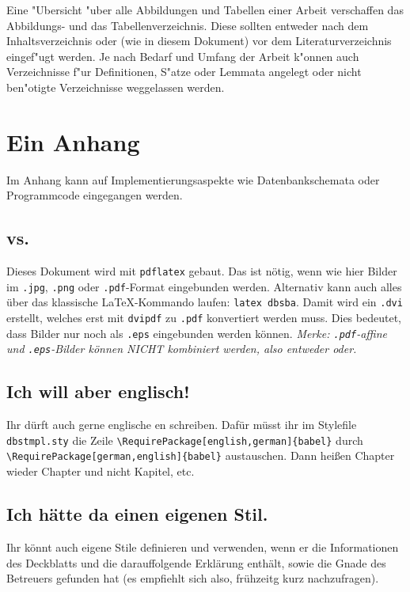 Eine "Ubersicht "uber alle Abbildungen und Tabellen einer Arbeit
verschaffen das Abbildungs- und das Tabellenverzeichnis. Diese
sollten entweder nach dem Inhaltsverzeichnis oder (wie in diesem
Dokument) vor dem Literaturverzeichnis eingef"ugt werden.
Je nach Bedarf und Umfang der Arbeit k"onnen auch Verzeichnisse
f"ur Definitionen, S"atze oder Lemmata angelegt oder nicht
ben"otigte Verzeichnisse weggelassen werden.

\appendix

\chapter{Ein Anhang}

Im Anhang kann auf Implementierungsaspekte wie Datenbankschemata
oder Programmcode eingegangen werden.

\section{ vs.\ }

Dieses Dokument wird mit {\tt pdflatex} gebaut. Das ist n\"otig, wenn
wie hier Bilder im {\tt .jpg}, {\tt .png} oder {\tt .pdf}-Format eingebunden
werden. Alternativ kann auch alles \"uber das klassische \LaTeX-Kommando
laufen: \verb=latex dbsba=. Damit wird ein {\tt .dvi} erstellt, welches
erst mit {\tt dvipdf} zu {\tt .pdf} konvertiert werden muss. Dies
bedeutet, dass Bilder nur noch als {\tt .eps} eingebunden werden
k\"onnen. {\em Merke: {\tt .pdf}-affine und {\tt .eps}-Bilder k\"onnen
NICHT kombiniert werden, also entweder oder.}

\section{Ich will aber englisch!}

Ihr d\"urft auch gerne englische \the\arbeit en schreiben. Daf\"ur m\"usst
ihr im Stylefile {\tt dbstmpl.sty} die Zeile
\verb=\RequirePackage[english,german]{babel}= durch
\verb=\RequirePackage[german,english]{babel}= austauschen. Dann hei\ss en
Chapter wieder Chapter und nicht Kapitel, etc.

\section{Ich h\"atte da einen eigenen Stil.}

Ihr k\"onnt auch eigene Stile definieren und verwenden, wenn er die
Informationen des Deckblatts und die darauffolgende Erkl\"arung
enth\"alt, sowie die Gnade des Betreuers gefunden hat (es
empfiehlt sich also, fr\"uhzeitg kurz nachzufragen).

